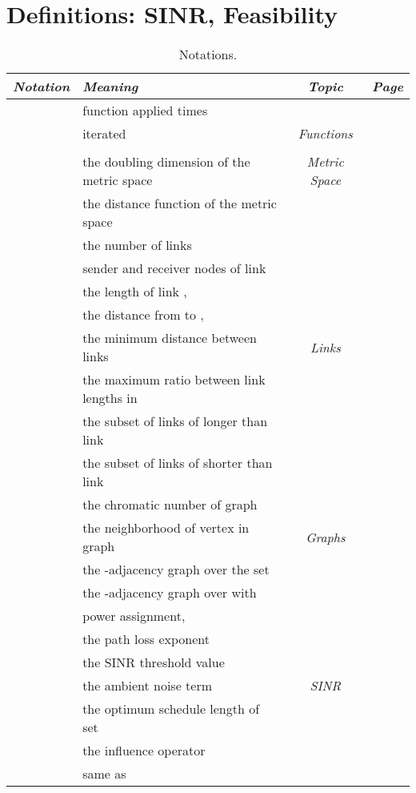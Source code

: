 \documentclass[11pt]{article}
\begin{document}
 



\section{Definitions: SINR, Feasibility}\label{S:sinr}


\begin{table}
\centering
    \begin{tabular}{  l  l c l }
		\textit{Notation} & \textit{Meaning} & \textit{Topic} & \textit{Page}\\\hline
     & function  applied  times & & {\pageref{G:frepeated}}\\
     & iterated  & \textit{Functions} & \pageref{G:fstar}\\
		 &  & & \pageref{G:tlog}\\\hline
 & the doubling dimension of the metric space & \textit{Metric Space} & \pageref{G:dimension}\\
     & the distance function of the metric space & & \pageref{G:distance}\\\hline
 & the number of links & & \pageref{G:numlinks} \\ 
     & sender and receiver nodes of link  & & \pageref{G:siri} \\ 
     & the length of link ,  & & \pageref{G:li}\\ 
     & the distance from  to ,  & & \pageref{G:asymdistance} \\
     & the minimum distance between links  & \textit{Links} & \pageref{G:symdistance}\\
     & the maximum ratio between link lengths in  & & \pageref{G:delta} \\
     & the subset of links of  longer than link  & & \pageref{G:liplus} \\
     & the subset of links of  shorter than link  & & \pageref{G:liminus} \\\hline
 & the chromatic number of graph  & & \pageref{G:chi}\\
		 & the neighborhood of vertex  in graph  & {\textit{Graphs}} & \pageref{G:nv}\\
     & the -adjacency graph over the set  &  & \pageref{G:gf} \\
     & the -adjacency graph over  with  & & \pageref{G:ggamma}\\\hline
 & power assignment,  & & \pageref{G:power}\\
     & the path loss exponent & & \pageref{G:alpha}\\
     & the SINR threshold value & & \pageref{G:beta}\\
     & the ambient noise term & \textit{SINR} & \pageref{G:noise}\\
     & the optimum schedule length of set  & & \pageref{G:opts}\\
     & the influence operator & & \pageref{G:influence}\\
     & same as  & & \pageref{G:il}\\
    \end{tabular}
    \caption{Notations.}
\end{table}
\end{document}
